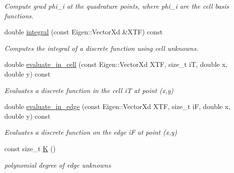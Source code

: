 \begin{DoxyCompactItemize}
\begin{DoxyCompactList}\small\item\em Compute \textquotesingle{}grad phi\+\_\+i\textquotesingle{} at the quadrature points, where phi\+\_\+i are the cell basis functions. \end{DoxyCompactList}\item 
\mbox{\label{classHArDCore2D_1_1HybridCore_aed85cdfc0bb96c65ce201528366e92f8}} 
double \hyperlink{classHArDCore2D_1_1HybridCore_aed85cdfc0bb96c65ce201528366e92f8}{integral} (const Eigen\+::\+Vector\+Xd \&X\+TF) const
\begin{DoxyCompactList}\small\item\em Computes the integral of a discrete function using cell unknowns. \end{DoxyCompactList}\item 
\mbox{\label{classHArDCore2D_1_1HybridCore_a58dd478934c1f5b65ae8b7df31e8ead4}} 
double \hyperlink{classHArDCore2D_1_1HybridCore_a58dd478934c1f5b65ae8b7df31e8ead4}{evaluate\+\_\+in\+\_\+cell} (const Eigen\+::\+Vector\+Xd X\+TF, size\+\_\+t iT, double x, double y) const
\begin{DoxyCompactList}\small\item\em Evaluates a discrete function in the cell iT at point (x,y) \end{DoxyCompactList}\item 
\mbox{\label{classHArDCore2D_1_1HybridCore_ae6795e8bc0058be7e399b379333032c8}} 
double \hyperlink{classHArDCore2D_1_1HybridCore_ae6795e8bc0058be7e399b379333032c8}{evaluate\+\_\+in\+\_\+edge} (const Eigen\+::\+Vector\+Xd X\+TF, size\+\_\+t iF, double x, double y) const
\begin{DoxyCompactList}\small\item\em Evaluates a discrete function on the edge iF at point (x,y) \end{DoxyCompactList}\item 
\mbox{\label{classHArDCore2D_1_1HybridCore_a74242d0a8b68fe5d9a35c6eb0effe3b2}} 
const size\+\_\+t \hyperlink{classHArDCore2D_1_1HybridCore_a74242d0a8b68fe5d9a35c6eb0effe3b2}{K} ()
\begin{DoxyCompactList}\small\item\em polynomial degree of edge unknowns \end{DoxyCompactList}\item 

\end{DoxyCompactItemize}
